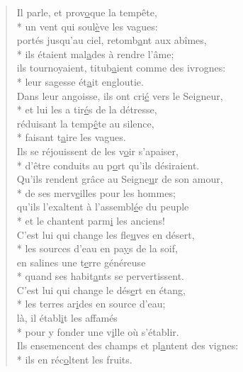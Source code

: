 \begin{verse}
Il parle, et prov\underline{o}que la tempête, \\*
un vent qui soul\underline{è}ve les vagues: \\
portés jusqu’au ciel, retomb\underline{a}nt aux abîmes, \\*
ils étaient mal\underline{a}des à rendre l’âme; \\
ils tournoyaient, titub\underline{a}ient comme des ivrognes: \\*
leur sagesse ét\underline{a}it engloutie. \\

Dans leur angoisse, ils ont cri\underline{é} vers le Seigneur, \\*
et lui les a tir\underline{é}s de la détresse, \\
réduisant la temp\underline{ê}te au silence, \\*
faisant t\underline{a}ire les vagues. \\
Ils se réjouissent de les v\underline{o}ir s’apaiser, \\*
d’être conduits au p\underline{o}rt qu’ils désiraient. \\

Qu’ils rendent grâce au Seigne\underline{u}r de son amour, \\*
de ses merv\underline{e}illes pour les hommes; \\
qu’ils l’exaltent à l’assembl\underline{é}e du peuple \\*
et le chantent parm\underline{i} les anciens! \\

C’est lui qui change les fle\underline{u}ves en désert, \\*
les sources d’eau en pa\underline{y}s de la soif, \\
en salines une t\underline{e}rre généreuse \\*
quand ses habit\underline{a}nts se pervertissent. \\

C’est lui qui change le dés\underline{e}rt en étang, \\*
les terres ar\underline{i}des en source d’eau; \\
là, il établ\underline{i}t les affamés \\*
pour y fonder une v\underline{i}lle où s’établir. \\
Ils ensemencent des champs et pl\underline{a}ntent des vignes: \\*
ils en réc\underline{o}ltent les fruits. \\


\end{verse}
